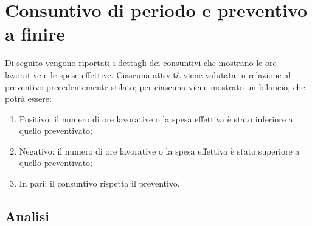 \clearpage
\section{Consuntivo di periodo e preventivo a finire}
Di seguito vengono riportati i dettagli dei consuntivi che mostrano le ore lavorative e le spese effettive.
Ciascuna attività viene valutata in relazione al preventivo precedentemente stilato; per ciascuna viene mostrato un bilancio, che potrà essere:
\begin{enumerate}
	\item Positivo: il numero di ore lavorative o la spesa effettiva è stato inferiore a quello preventivato;
	\item Negativo: il numero di ore lavorative o la spesa effettiva è stato superiore a quello preventivato;
	\item In pari: il consuntivo rispetta il preventivo.
\end{enumerate}
\subsection{Analisi}

